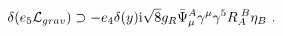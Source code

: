 \begin{equation}  
\delta  (e_5{\cal L}_{grav}) \supset -e_4\delta(y){\rm i}\sqrt{8}g_R \bar{\Psi}_\mu^A\gamma^\mu\gamma^5 R_{A}^{\;B}\eta_B \ .
\end{equation} 

